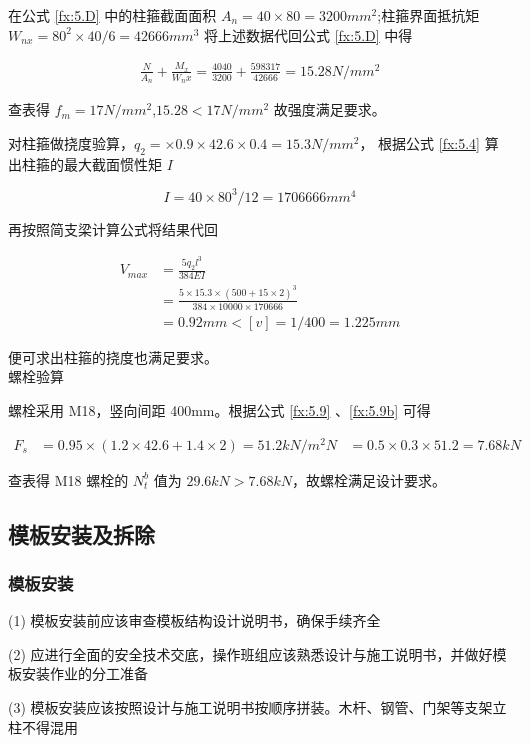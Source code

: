 在公式 \ref{fx:5.D} 中的柱箍截面面积 $A_n=40\times 80=3200 mm^2$;柱箍界面抵抗矩 $W_{nx}=80^2\times 40/6=42666 mm^3$
将上述数据代回公式 \ref{fx:5.D} 中得

\begin{align*}
    \frac{N}{A_n}+\frac{M_x}{W_nx}=\frac{4040}{3200}+\frac{598317}{42666}=15.28 N/mm^2
\end{align*}

查表得 $f_m=17N/mm^2$,$15.28<17N/mm^2$ 故强度满足要求。

对柱箍做挠度验算，$q_2=\times 0.9\times 42.6\times 0.4=15.3 N/mm^2$，
根据公式 \ref{fx:5.4} 算出柱箍的最大截面惯性矩 $I$

\[
    I=40\times 80^3 /12=1706666 mm^4
\]

再按照简支梁计算公式将结果代回

\begin{align*}
    V_{max}&=\frac{5q_2l^3}{384EI}\\
    &=\frac{5\times 15.3\times (500+15\times 2)^3}{384\times 10000\times 170666}\\
    &=0.92mm<[v]=1/400=1.225mm
\end{align*}

便可求出柱箍的挠度也满足要求。\\

 螺栓验算

螺栓采用 M18，竖向间距 400mm。根据公式 \ref{fx:5.9} 、\ref{fx:5.9b} 可得

\begin{align*}
    F_s&=0.95\times(1.2\times 42.6+1.4\times 2)=51.2 kN/m^2
    N&=0.5\times 0.3\times 51.2=7.68 kN
\end{align*}

查表得 M18 螺栓的 $N^b_t$ 值为 $29.6 kN>7.68 kN$，故螺栓满足设计要求。

\subsection{模板安装及拆除}
\subsubsection{模板安装}

(1) 模板安装前应该审查模板结构设计说明书，确保手续齐全

(2) 应进行全面的安全技术交底，操作班组应该熟悉设计与施工说明书，并做好模板安装作业的分工准备

(3) 模板安装应该按照设计与施工说明书按顺序拼装。木杆、钢管、门架等支架立柱不得混用

